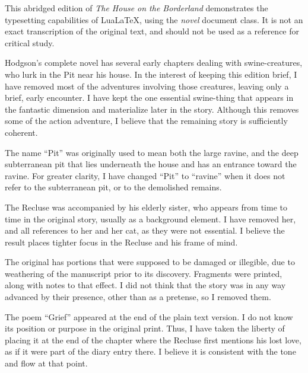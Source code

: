 \documentclass{novel} %
\begin{document}
\thispagestyle{empty} %
\begin{ChapterStart}
\null\null
{}
\end{ChapterStart}
This abridged edition of \textit{The House on the Borderland} demonstrates the typesetting capabilities of LuaLaTeX, using the \textit{novel} document class. It is not an exact transcription of the original text, and should not be used as a reference for critical study.\par
Hodgson’s complete novel has several early chapters dealing with swine-creatures, who lurk in the Pit near his house. In the interest of keeping this edition brief, I have removed most of the adventures involving those creatures, leaving only a brief, early encounter. I have kept the one essential swine-thing that appears in the fantastic dimension and materialize later in the story. Although this removes some of the action adventure, I believe that the remaining story is sufficiently coherent.\par
The name “Pit” was originally used to mean both the large ravine, and the deep subterranean pit that lies underneath the house and has an entrance toward the ravine. For greater clarity, I have changed “Pit” to “ravine” when it does not refer to the subterranean pit, or to the demolished remains.\par
The Recluse was accompanied by his elderly sister, who appears from time to time in the original story, usually as a background element. I have removed her, and all references to her and her cat, as they were not essential. I believe the result places tighter focus in the Recluse and his frame of mind.\par
The original has portions that were supposed to be damaged or illegible, due to weathering of the manuscript prior to its discovery. Fragments were printed, along with notes to that effect. I did not think that the story was in any way advanced by their presence, other than as a pretense, so I removed them.\par
The poem “Grief” appeared at the end of the plain text version. I do not know its position or purpose in the original print. Thus, I have taken the liberty of placing it at the end of the chapter where the Recluse first mentions his lost love, as if it were part of the diary entry there. I believe it is consistent with the tone and flow at that point.\par
\end{document}
